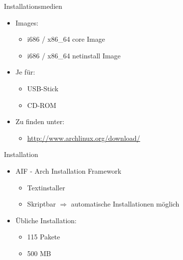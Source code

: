 
\begin{slide}{Installationsmedien}
	\begin{itemize}
		\item{Images:
			\begin{itemize}
				\item{i686 / x86\_64 core Image}
				\item{i686 / x86\_64 netinstall Image}
			\end{itemize}
		}
		
		\item{Je f\"{u}r:
			\begin{itemize}
				\item{USB-Stick}
				\item{CD-ROM}
			\end{itemize}
		}
		\item{Zu finden unter:
			\begin{itemize}
				\item{\url{http://www.archlinux.org/download/}}
			\end{itemize}
		}
	\end{itemize}
\end{slide}

\begin{slide}{Installation}
	\begin{itemize}
		\item{AIF - Arch Installation Framework
			\begin{itemize}
				\item{Textinstaller}
				\item{Skriptbar $\Rightarrow{}$ automatische Installationen m\"{o}glich}
			\end{itemize}
		}
		\item{\"{U}bliche Installation:
			\begin{itemize}
				\item{115 Pakete}
				\item{500 MB}
			\end{itemize}
		}
	\end{itemize}
\end{slide}

